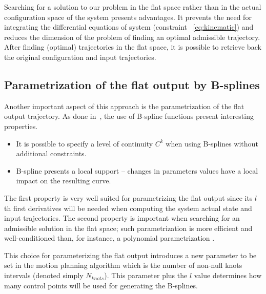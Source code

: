 
Searching for a solution to our problem in the flat space rather than in
the actual configuration space of the system presents advantages.
It prevents the need for integrating the differential equations
of system (constraint ~\ref{eq:kinematic}) and reduces the dimension of the 
problem of finding an optimal admissible trajectory.
After finding (optimal) trajectories in the flat space, it is possible
to retrieve back the original configuration and input trajectories.


\subsection{Parametrization of the flat output by B-splines}


Another important aspect of this approach is the parametrization of 
the flat output trajectory. As done in~\cite{Milam2003}, the use
of B-spline functions present interesting properties.
\begin{itemize}


 \item It is possible to specify a level of continuity $C^k$ when using
 B-splines without additional constraints.
 
 \item B-spline presents a local support -- changes in parameters values have a 
 local impact on the resulting curve.
 
 
\end{itemize}
The first property is very well suited for parametrizing the flat output since
its $l$th first derivatives will be needed when computing the system actual state
and input trajectories. The second property is important when searching for an
admissible solution in the flat space; such parametrization is more efficient
and well-conditioned than, for instance, a polynomial parametrization \cite{Milam2003}.


This choice for parameterizing the flat output introduces a new parameter to be set in
the motion planning algorithm which is the number of non-null knots intervals 
(denoted simply $N_{knots}$). This parameter plus the $l$ value determines how many 
control points will be used for generating the B-splines.

